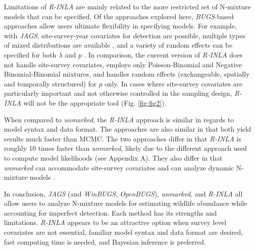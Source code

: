 \documentclass{article}
\begin{document}
Limitations of \emph{R-INLA} are mainly related to the more restricted set of N-mixture models that can be specified. Of the approaches explored here, \emph{BUGS}-based approaches allow users ultimate flexibility in specifying models. For example, with \emph{JAGS}, site-survey-year covariates for detection are possible, multiple types of mixed distributions are available \citep{Joseph_Elkin_Martin_Possingham_2009,Martin_Royle_Mackenzie_Edwards_Kery_Gardner_2011}, and a variety of random effects can be specified for both $\lambda$ and $p$ \citep{Kery_Schaub_2011}. In comparison, the current version of \emph{R-INLA} does not handle site-survey covariates, employs only Poisson-Binomial and Negative Binomial-Binomial mixtures, and handles random effects (exchangeable, spatially and temporally structured) for $p$ only. In cases where site-survey covariates are particularly important and not otherwise controlled in the sampling design, \emph{R-INLA} will not be the appropriate tool (Fig. \ref{fig:fig2}).

When compared to \emph{unmarked}, the \emph{R-INLA} approach is similar in regards to model syntax and data format. The approaches are also similar in that both yield results much faster than MCMC. The two approaches differ in that \emph{R-INLA} is roughly 10 times faster than \emph{unmarked}, likely due to the different approach used to compute model likelihoods (see Appendix A). They also differ in that \emph{unmarked} can accommodate site-survey covariates and can analyze dynamic N-mixture models \citep{Chandler_Royle_King_2011, Dail_Madsen_2011}.

In conclusion, \emph{JAGS} (and \emph{WinBUGS}, \emph{OpenBUGS}), \emph{unmarked}, and \emph{R-INLA} all allow users to analyze N-mixture models for estimating wildlife abundance while accounting for imperfect detection. Each method has its strengths and limitations. \emph{R-INLA} appears to be an attractive option when survey level covariates are not essential, familiar model syntax and data format are desired, fast computing time is needed, and Bayesian inference is preferred.




\appendix
\end{document}
